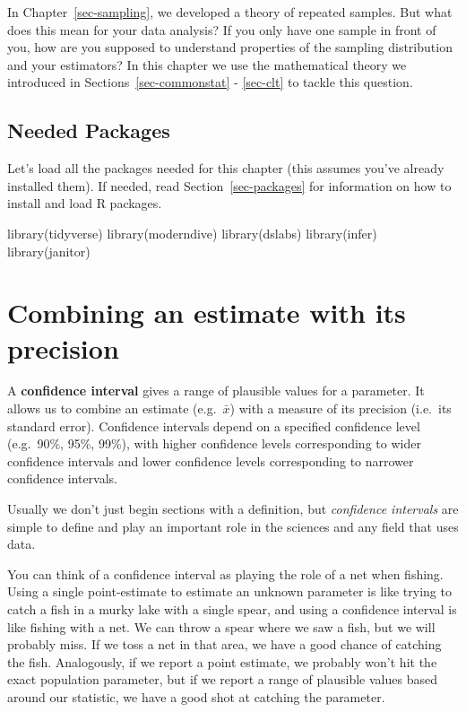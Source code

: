 \documentclass[
  letterpaper,
  DIV=11,
  numbers=noendperiod]{scrreprt}
\newenvironment{Shaded}{\begin{snugshade}}{\end{snugshade}}
\newcommand{\FunctionTok}[1]{\textcolor[rgb]{0.28,0.35,0.67}{#1}}
\newcommand{\NormalTok}[1]{\textcolor[rgb]{0.00,0.23,0.31}{#1}}
\theoremstyle{definition}
\theoremstyle{remark}
\begin{document}
In Chapter~\ref{sec-sampling}, we developed a theory of repeated
samples. But what does this mean for your data analysis? If you only
have one sample in front of you, how are you supposed to understand
properties of the sampling distribution and your estimators? In this
chapter we use the mathematical theory we introduced in
Sections~\ref{sec-commonstat} - \ref{sec-clt} to tackle this question.

\hypertarget{needed-packages-4}{%
\subsection*{Needed Packages}\label{needed-packages-4}}

Let's load all the packages needed for this chapter (this assumes you've
already installed them). If needed, read Section~\ref{sec-packages} for
information on how to install and load R packages.

\begin{Shaded}
\begin{Highlighting}[]
\FunctionTok{library}\NormalTok{(tidyverse)}
\FunctionTok{library}\NormalTok{(moderndive)}
\FunctionTok{library}\NormalTok{(dslabs)}
\FunctionTok{library}\NormalTok{(infer)}
\FunctionTok{library}\NormalTok{(janitor)}
\end{Highlighting}
\end{Shaded}

\hypertarget{combining-an-estimate-with-its-precision}{%
\section{Combining an estimate with its
precision}\label{combining-an-estimate-with-its-precision}}

A \textbf{confidence interval} gives a range of plausible values for a
parameter. It allows us to combine an estimate (e.g.~\(\bar{x}\)) with a
measure of its precision (i.e.~its standard error). Confidence intervals
depend on a specified confidence level (e.g.~90\%, 95\%, 99\%), with
higher confidence levels corresponding to wider confidence intervals and
lower confidence levels corresponding to narrower confidence intervals.

Usually we don't just begin sections with a definition, but
\emph{confidence intervals} are simple to define and play an important
role in the sciences and any field that uses data.

You can think of a confidence interval as playing the role of a net when
fishing. Using a single point-estimate to estimate an unknown parameter
is like trying to catch a fish in a murky lake with a single spear, and
using a confidence interval is like fishing with a net. We can throw a
spear where we saw a fish, but we will probably miss. If we toss a net
in that area, we have a good chance of catching the fish. Analogously,
if we report a point estimate, we probably won't hit the exact
population parameter, but if we report a range of plausible values based
around our statistic, we have a good shot at catching the parameter.
\end{document}
